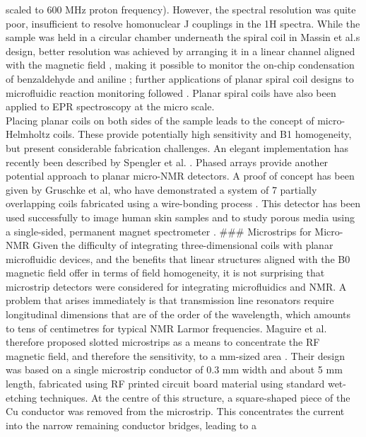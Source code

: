 scaled to 600 MHz proton frequency). However, the spectral resolution
was quite poor, insufficient to resolve homonuclear J couplings in the
1H spectra. While the sample was held in a circular chamber underneath
the spiral coil in Massin et al.s design, better resolution was achieved
by arranging it in a linear channel aligned with the magnetic field
\cite{Wensink:2004kd}, making it possible to monitor the on-chip
condensation of benzaldehyde and aniline \cite{Wensink:2005fs}; further
applications of planar spiral coil designs to microfluidic reaction
monitoring followed \cite{Gomez:2010jr,Yue:2012fw}. Planar spiral coils
have also been applied to EPR spectroscopy \cite{Boero:2003hf} at the micro
scale.\\Placing planar coils on both sides of the sample leads to the
concept of micro-Helmholtz coils. These provide potentially high
sensitivity and B1 homogeneity, but present considerable fabrication
challenges. An elegant implementation has recently been described by
Spengler et al. \cite{Spengler:2014r,Spengler:2016km}. Phased arrays
provide another potential approach to planar micro-NMR detectors. A
proof of concept has been given by Gruschke et al, who have demonstrated
a system of 7 partially overlapping coils fabricated using a
wire-bonding process \cite{Gruschke:2012df}. This detector has been used
successfully to image human skin samples \cite{Gobel:2014n} and to study
porous media using a single-sided, permanent magnet spectrometer
\cite{Oligschlager:2015fl}. \#\#\# Microstrips for Micro-NMR Given the
difficulty of integrating three-dimensional coils with planar
microfluidic devices, and the benefits that linear structures aligned
with the B0 magnetic field offer in terms of field homogeneity, it is
not surprising that microstrip detectors were considered for integrating
microfluidics and NMR. A problem that arises immediately is that
transmission line resonators require longitudinal dimensions that are of
the order of the wavelength, which amounts to tens of centimetres for
typical NMR Larmor frequencies. Maguire et al. therefore proposed
slotted microstrips as a means to concentrate the RF magnetic field, and
therefore the sensitivity, to a mm-sized area
\cite{Maguire:2004wc,Maguire:2007ko}. Their design was based on a single
microstrip conductor of 0.3 mm width and about 5 mm length, fabricated
using RF printed circuit board material using standard wet-etching
techniques. At the centre of this structure, a square-shaped piece of
the Cu conductor was removed from the microstrip. This concentrates the
current into the narrow remaining conductor bridges, leading to a
